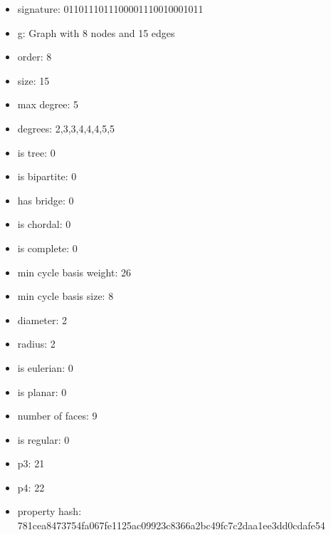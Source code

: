 \begin{itemize}
\item signature: 0110111011100001110010001011
\item g: Graph with 8 nodes and 15 edges
\item order: 8
\item size: 15
\item max degree: 5
\item degrees: 2,3,3,4,4,4,5,5
\item is tree: 0
\item is bipartite: 0
\item has bridge: 0
\item is chordal: 0
\item is complete: 0
\item min cycle basis weight: 26
\item min cycle basis size: 8
\item diameter: 2
\item radius: 2
\item is eulerian: 0
\item is planar: 0
\item number of faces: 9
\item is regular: 0
\item p3: 21
\item p4: 22
\item property hash: 781cea8473754fa067fe1125ac09923c8366a2bc49fc7c2daa1ee3dd0cdafe54
\end{itemize}
\newpage
\begin{figure}
\end{figure}
